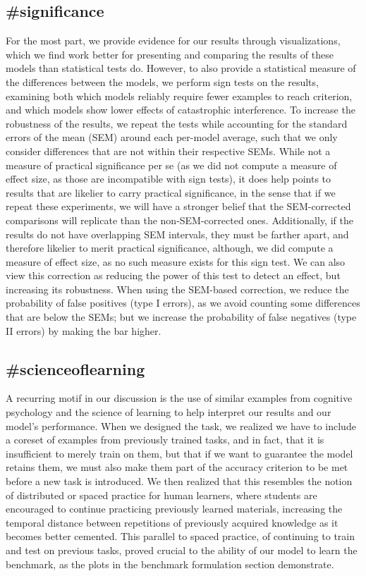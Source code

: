 \subsection{\#significance}
For the most part, we provide evidence for our results through visualizations, which we find work better for presenting and comparing the results of these models than statistical tests do. However, to also provide a statistical measure of the differences between the models, we perform sign tests on the results, examining both which models reliably require fewer examples to reach criterion, and which models show lower effects of catastrophic interference. To increase the robustness of the results, we repeat the tests while accounting for the standard errors of the mean (SEM) around each per-model average, such that we only consider differences that are not within their respective SEMs. While not a measure of practical significance per se (as we did not compute a measure of effect size, as those are incompatible with sign tests), it does help points to results that are likelier to carry practical significance, in the sense that if we repeat these experiments, we will have a stronger belief that the SEM-corrected comparisons will replicate than the non-SEM-corrected ones. Additionally, if the results do not have overlapping SEM intervals, they must be farther apart, and therefore likelier to merit practical significance, although, we did compute a measure of effect size, as no such measure exists for this sign test. We can also view this correction as reducing the power of this test to detect an effect, but increasing its robustness. When using the SEM-based correction, we reduce the probability of false positives (type I errors), as we avoid counting some differences that are below the SEMs; but we increase the probability of false negatives (type II errors) by making the bar higher. 

\subsection{\#scienceoflearning}
A recurring motif in our discussion is the use of similar examples from cognitive psychology and the science of learning to help interpret our results and our model’s performance. When we designed the task, we realized we have to include a coreset of examples from previously trained tasks, and in fact, that it is insufficient to merely train on them, but that if we want to guarantee the model retains them, we must also make them part of the accuracy criterion to be met before a new task is introduced. We then realized that this resembles the notion of distributed or spaced practice for human learners, where students are encouraged to continue practicing previously learned materials, increasing the temporal distance between repetitions of previously acquired knowledge as it becomes better cemented. This parallel to spaced practice, of continuing to train and test on previous tasks, proved crucial to the ability of our model to learn the benchmark, as the plots in the benchmark formulation section demonstrate.

